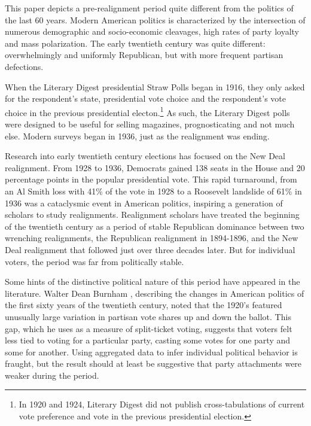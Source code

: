 \documentclass[11pt]{scrartcl}\usepackage[]{graphicx}\usepackage[]{color}
\begin{document}
This paper depicts a pre-realignment period quite different from the politics of the last 60 years. Modern American politics is characterized by the intersection of numerous demographic and socio-economic cleavages, high rates of party loyalty and mass polarization. The early twentieth century was quite different: overwhelmingly and uniformly Republican, but with more frequent partisan defections. 


When the Literary Digest presidential Straw Polls began in 1916, they only asked for the respondent's state, presidential vote choice and the respondent's vote choice in the previous presidential electon.\footnote{In 1920 and 1924, Literary Digest did not publish cross-tabulations of current vote preference and vote in the previous presidential election.}  As such, the Literary Digest polls were designed to be useful for selling magazines, prognosticating and not much else.  Modern surveys began in 1936, just as the realignment was ending.  


Research into early twentieth century elections has  focused on the New Deal realignment.  From 1928 to 1936, Democrats gained 138 seats in the House and 20 percentage points in the popular presidential vote.  This rapid turnaround, from an Al Smith loss with 41\% of the vote in 1928 to a Roosevelt landslide of 61\% in 1936 was a cataclysmic event in American politics, inspiring a generation of scholars to study realignments. Realignment scholars have treated the beginning of the twentieth century as a period of stable Republican dominance between two wrenching realignments, the Republican realignment in 1894-1896, and the New Deal realignment that followed just over three decades later. But for individual voters, the period was far from politically stable.

Some hints of the distinctive political nature of this period have appeared in the literature.  Walter Dean Burnham \citeyearpar{burnham1965changing}, describing the changes in American politics of the first sixty years of the twentieth century, noted that the 1920's featured unusually large variation in partisan vote shares up and down the ballot.  This gap, which he uses as a measure of split-ticket voting, suggests that voters felt less tied to voting for a particular party, casting some votes for one party and some for another. Using aggregated data to infer individual political behavior is fraught, but the result should at least be suggestive that party attachments were weaker during the period.
\end{document}
